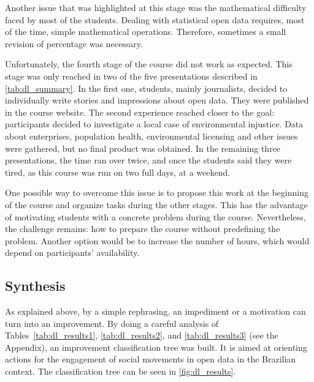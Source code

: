 Another issue that was highlighted at this stage was the mathematical difficulty faced by most of the students. Dealing with statistical open data requires, most of the time, simple mathematical operations. Therefore, sometimes a small revision of percentage was necessary.

Unfortunately, the fourth stage of the course did not work as expected. This stage was only reached in two of the five presentations described in \autoref{tab:dl_summary}. In the first one, students, mainly journalists, decided to individually write stories and impressions about open data. They were published in the course website. The second experience reached closer to the goal: participants decided to investigate a local case of environmental injustice. Data about enterprises, population health, environmental licensing and other issues were gathered, but no final product was obtained. In the remaining three presentations, the time ran over twice, and once the students said they were tired, as this course was run on two full days, at a weekend.

One possible way to overcome this issue is to propose this work at the beginning of the course and organize tasks during the other stages. This has the advantage of motivating students with a concrete problem during the course. Nevertheless, the challenge remains: how to prepare the course without predefining the problem. Another option would be to increase the number of hours, which would depend on participants' availability.

\subsection{Synthesis}

As explained above, by a simple rephrasing, an impediment or a motivation can turn into an improvement. By doing a careful analysis of Tables~\ref{tab:dl_results1}, \ref{tab:dl_results2}, and \ref{tab:dl_results3} (see the Appendix), an improvement classification tree was built. It is aimed at orienting actions for the engagement of social movements in open data in the Brazilian context. The classification tree can be seen in \autoref{fig:dl_results}.

